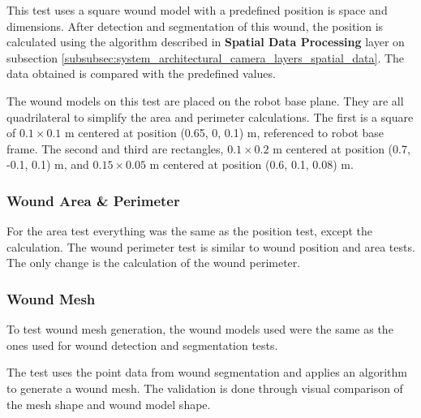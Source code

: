 This test uses a square wound model with a predefined position is space and dimensions. After detection and segmentation of this wound, the position is calculated using the algorithm described in \textbf{Spatial Data Processing} layer on subsection \ref{subsubsec:system_architectural_camera_layers_spatial_data}. The data obtained is compared with the predefined values.

The wound models on this test are placed on the robot base plane. They are all quadrilateral to simplify the area and perimeter calculations. The first is a square of $0.1\times0.1$ \si{\meter} centered at position (0.65, 0, 0.1) \si{\meter}, referenced to robot base frame. The second and third are rectangles, $0.1\times0.2$ \si{\meter} centered at position (0.7, -0.1, 0.1) \si{\meter}, and $0.15\times0.05$ \si{\meter} centered at position (0.6, 0.1, 0.08) \si{\meter}.

\subsubsection*{Wound Area \& Perimeter}
\label{subsubsec:system_validation_tests_setup_camera_spatial_data_processing_area_perimeter}

For the area test everything was the same as the position test, except the calculation. The wound perimeter test is similar to wound position and area tests. The only change is the calculation of the wound perimeter.
 

\subsubsection*{Wound Mesh}
\label{subsubsec:system_validation_tests_setup_camera_spatial_data_processing_mesh}

To test wound mesh generation, the wound models used were the same as the ones used for wound detection and segmentation tests.

The test uses the point data from wound segmentation and applies an algorithm to generate a wound mesh. The validation is done through visual comparison of the mesh shape and wound model shape.
 


